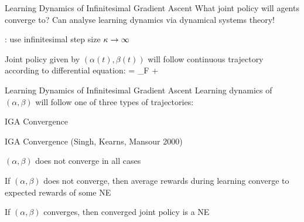 \begin{frame}{Learning Dynamics of Infinitesimal Gradient Ascent}
    What joint policy will agents converge to?
    \listtab Can analyse learning dynamics via dynamical systems theory!

    \vspace{10pt}
    
    : use infinitesimal step size $\kappa \to \infty$

    Joint policy given by $(\alpha(t),\beta(t))$ will follow continuous trajectory according to differential equation:
    \bmath
	 = _{F}  + 
    \emath
\end{frame}

\begin{frame}[t]{Learning Dynamics of Infinitesimal Gradient Ascent}
    Learning dynamics of $(\alpha,\beta)$ will follow one of three types of trajectories: \\[10pt]
    \begin{figure}
    \hfill
    \hfill
    \end{figure}
\end{frame}

\begin{frame}{IGA Convergence}
    \begin{custombox}{IGA Convergence (Singh, Kearns, Mansour 2000)}
        \blist
            \itemsep=10pt
    	\item<1-> $(\alpha,\beta)$ does not converge in all cases
    	\item<2-> If $(\alpha,\beta)$ does not converge, then average rewards during learning converge to expected rewards of some NE
    	\item<3-> If $(\alpha,\beta)$ converges, then converged joint policy is a NE
        \elist
    \end{custombox}
\end{frame}

